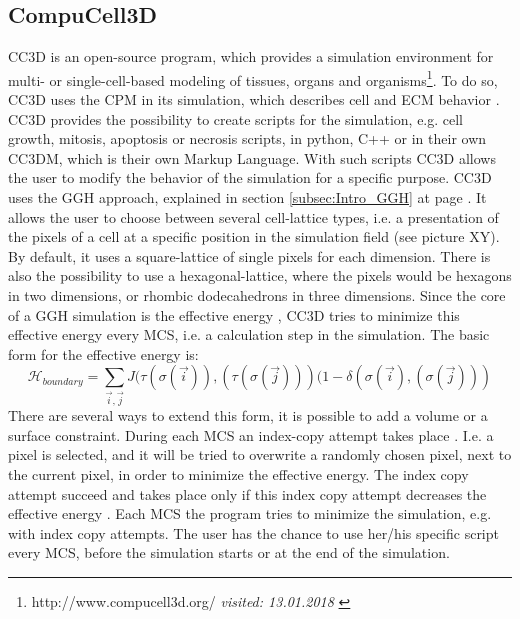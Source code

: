 \subsection{CompuCell3D}
\ac{CC3D} is an open-source program, which provides a simulation environment for multi- or single-cell-based modeling of tissues, organs and organisms\footnote{http://www.compucell3d.org/ \textit{visited: 13.01.2018} \label{ftn:cc3d.org}}. To do so, \ac{CC3D} uses the \ac{CPM} in its simulation, which describes cell and \ac{ECM} behavior \cite{Izaguirre2004}. 
CC3D provides the possibility to create scripts for the simulation, e.g. cell growth, mitosis, apoptosis or necrosis scripts, in python, C++ or in their own CC3DM, which is their own Markup Language. With such scripts CC3D allows the user to modify the behavior of the simulation for a specific purpose.
CC3D uses the \ac{GGH} approach, explained in section \ref{subsec:Intro_GGH} at page \pageref{subsec:Intro_GGH}. It allows the user to choose between several cell-lattice types, i.e. a presentation of the pixels of a cell at a specific position in the simulation field (see picture XY). By default, it uses a square-lattice of single pixels for each dimension. There is also the possibility to use a hexagonal-lattice, where the pixels would be hexagons in two dimensions, or rhombic dodecahedrons in three dimensions.
Since the core of a \ac{GGH} simulation is the effective energy \cite{IntroCC3D}, \ac{CC3D} tries to minimize this effective energy every \ac{MCS}, i.e. a calculation step in the simulation. The basic form for the effective energy is:
\begin{equation}
\mathcal{H}_{boundary} = \sum_{\vec{i},\vec{j}}^{ }{J(\tau(\sigma(\vec{i})),(\tau(\sigma(\vec{j})))(1-\delta(\sigma(\vec{i}),(\sigma(\vec{j})))}
\end{equation}
There are several ways to extend this form, it is possible to add a volume or a surface constraint. During each \ac{MCS} an index-copy attempt takes place \cite{MaciejH.Swat2017}. I.e. a pixel is selected, and it will be tried to overwrite a randomly chosen pixel, next to the current pixel, in order to minimize the effective energy. The index copy attempt succeed and takes place only if this index copy attempt decreases the effective energy \cite{IntroCC3D}. Each \ac{MCS} the program tries to minimize the simulation, e.g. with index copy attempts. The user has the chance to use her/his specific script every \ac{MCS}, before the simulation starts or at the end of the simulation.

